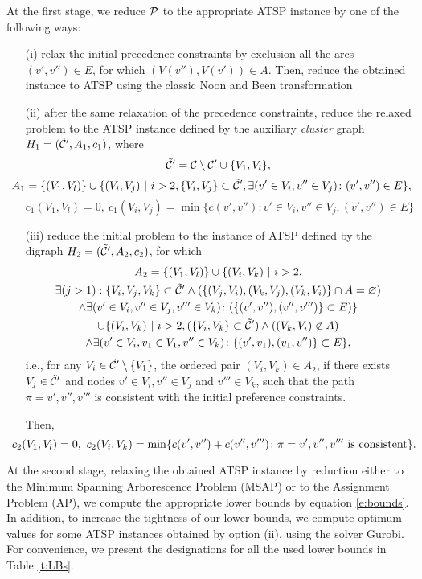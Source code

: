 At the first stage, we reduce $\P$ to the appropriate ATSP instance by one of the following ways:
\begin{itemize}
	\item[(i)] relax the initial precedence constraints by exclusion all the arcs $(v',v'')\in E$, for which $(V(v''),V(v'))\in A$. Then, reduce the obtained instance to ATSP using the classic Noon and Been transformation \cite{NoonBean1993}
	\item[(ii)] after the same relaxation of the precedence constraints, reduce the relaxed problem to the ATSP instance defined by the auxiliary \textit{cluster} graph $H_1=(\tilde\CX',A_1, c_1)$, where
	\[
		\tilde\CX'=\CX\setminus\CX'\cup\{V_1,V_l\},
	\]
	\[\hspace*{-3ex}
	A_1=\{(V_1,V_l)\}\cup\{(V_i,V_j)\ |\  i>2, \{V_i,V_j\}\subset\tilde\CX', \exists (v'\in V_i, v''\in V_j)\colon (v',v'')\in E\},
	\]
	\[
	c_1(V_1,V_l) = 0,\ c_1(V_i,V_j) = \min\{c(v',v'')\colon v'\in V_i, v''\in V_j, (v',v'')\in E\}
	\]
	\item[(iii)] reduce the initial problem to the instance of ATSP defined by the digraph $H_2=(\tilde\CX',A_2, c_2)$, for which
	\begin{multline*}
	A_2=\{(V_1,V_l)\}\cup\{(V_i, V_k)\ |\ i>2,\\ \exists (j>1): \{V_i,V_j,V_k\}\subset\tilde\CX' \wedge (\{(V_j,V_i), (V_k,V_j), (V_k, V_i)\}\cap A=\varnothing)\\
	 \wedge \exists (v'\in V_i, v''\in V_j, v'''\in V_k)\colon (\{(v',v''),(v'',v''')\}\subset E)\}\\
	\cup \{(V_i, V_k)\ |\ i>2, (\{V_i,V_k\}\subset\tilde\CX')\wedge ((V_k,V_i)\not\in A)\\
	\wedge \exists (v'\in V_i, v_1\in V_1, v''\in V_k)\colon \{(v',v_1), (v_1,v'')\}\subset E\},	
	\end{multline*}
	i.e., for any $V_i\in \tilde\CX'\setminus\{V_1\}$, the ordered pair $(V_i,V_k)\in A_2$, if there exists $V_j\in\tilde\CX'$ and nodes $v'\in V_i, v''\in V_j$ and $v'''\in V_k$, such that the path $\pi = v',v'', v'''$ is consistent with the initial preference constraints. 

	Then,  
	\[
	\hspace*{-3ex} c_2(V_1,V_l) = 0,\ c_2(V_i,V_k) = \min\{c(v',v'')+c(v'',v''')\colon \pi=v',v'', v''' \text{ is consistent}\}.
	\]
\end{itemize}

At the second stage, relaxing the obtained ATSP instance by reduction either to the Minimum Spanning Arborescence Problem (MSAP) or to the Assignment Problem (AP), we compute the appropriate lower bounds by equation \eqref{e:bounds}. In addition,  to increase the tightness of our lower bounds, we compute optimum values for some ATSP instances obtained by option (ii), using the solver Gurobi. For convenience, we present the designations for all the used lower bounds in Table \ref{t:LBs}. 


